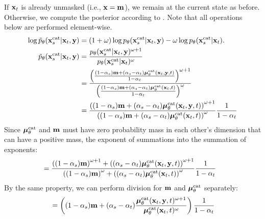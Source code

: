 \begin{rebuttal}
If ${\mathbf{x}}_t$ is already unmasked (i.e., ${\mathbf{x}} = {\mathbf{m}}$), we remain at the current state as before. Otherwise, we compute the posterior according to . Note that all operations below are performed element-wise.
\begin{equation*}
    \begin{aligned}
        \log \tilde{p}_{\theta}({\mathbf{x}}_{s}^{{\rm cat}} | {\mathbf{x}}_t, {\mathbf{y}})
    &= (1+\omega) \log p_{\theta}({\mathbf{x}}_{s}^{{\rm cat}} | {\mathbf{x}}_t, {\mathbf{y}})  - \omega \log {p}_{\theta}({\mathbf{x}}_{s}^{{\rm cat}} | {\mathbf{x}}_t). \\
    \tilde{p}_{\theta}({\mathbf{x}}_{s}^{{\rm cat}} | {\mathbf{x}}_t, {\mathbf{y}}) &= \frac{p_{\theta}({\mathbf{x}}_{s}^{{\rm cat}} | {\mathbf{x}}_t, {\mathbf{y}})^{\omega+1}}{{p}_{\theta}({\mathbf{x}}_{s}^{{\rm cat}} | {\mathbf{x}}_t)^{\omega}}
    \\
    \quad &= \frac{\left( \frac{(1 - \alpha_{s}) {\mathbf{m}} + (\alpha_{s} - \alpha_t) {\bm{\mu}}_{\theta}^{{\rm cat}}({\mathbf{x}}_t, {\mathbf{y}}, t)}{1 - \alpha_t} \right)^{\omega+1} }{\left( \frac{(1 - \alpha_{s}) {\mathbf{m}} + (\alpha_{s} - \alpha_t) {\bm{\mu}}_{\theta}^{{\rm cat}}({\mathbf{x}}_t, t)}{1 - \alpha_t} \right)^{\omega}}
    \\
    &= \frac{\left( (1 - \alpha_{s}) {\mathbf{m}} + (\alpha_{s} - \alpha_t) {\bm{\mu}}_{\theta}^{{\rm cat}}({\mathbf{x}}_t, {\mathbf{y}}, t) \right)^{\omega+1}}{\left( (1 - \alpha_{s}) {\mathbf{m}} + (\alpha_{s} - \alpha_t) {\bm{\mu}}_{\theta}^{{\rm cat}}({\mathbf{x}}_t, t) \right)^{\omega}} \frac{1}{1-\alpha_t}
    \end{aligned}
\end{equation*}
Since ${\bm{\mu}}_{\theta}^{{\rm cat}}$ and ${\mathbf{m}}$ must have zero probability mass in each other's dimension that can have a positive mass, the exponent of summations into the summation of exponents:
\begin{equation*}
    \begin{aligned}
    &= \frac{\left( (1 - \alpha_{s}) {\mathbf{m}} \right)^{\omega+1} + \left((\alpha_{s} - \alpha_t) {\bm{\mu}}_{\theta}^{{\rm cat}}({\mathbf{x}}_t, {\mathbf{y}}, t) \right)^{\omega+1}}
    {\left( (1 - \alpha_{s}) {\mathbf{m}} \right)^{\omega} + \left( (\alpha_{s} - \alpha_t) {\bm{\mu}}_{\theta}^{{\rm cat}}({\mathbf{x}}_t, t) \right)^{\omega}} \frac{1}{1-\alpha_t}
    \end{aligned}
\end{equation*}
By the same property, we can perform division for ${\mathbf{m}}$ and ${\bm{\mu}}_{\theta}^{{\rm cat}}$ separately:
\begin{equation*}
    \begin{aligned}
    &= \left( (1 - \alpha_{s}) \rvm + (\alpha_{s} - \alpha_t) \frac{\vmu_{\theta}^{\cat}(\rvx_t, \rvy, t)^{\omega+1}}{\vmu_{\theta}^{\cat}(\rvx_t, t)^{\omega}}\right) \frac{1}{1-\alpha_t} \\

\end{aligned}
\end{equation*}
\end{rebuttal}
